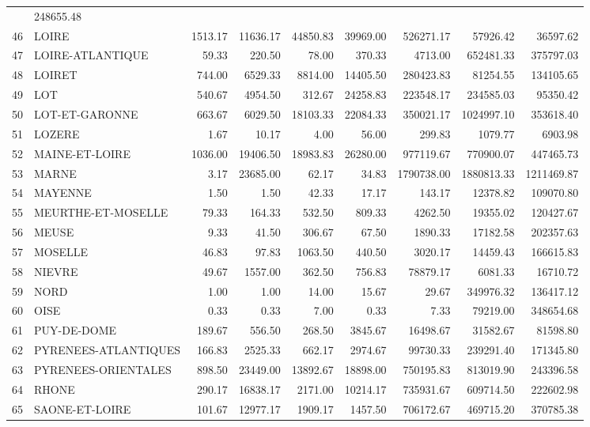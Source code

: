 \documentclass[11pt, a4paper]{article}
\begin{document}
\begin{center}
\begin{table}[ht]
\begin{tabular}{rlrrrrrrr}
& 248655.48 \\ 
  46 & LOIRE & 1513.17 & 11636.17 & 44850.83 & 39969.00 & 526271.17 & 57926.42 & 36597.62 \\ 
  47 & LOIRE-ATLANTIQUE & 59.33 & 220.50 & 78.00 & 370.33 & 4713.00 & 652481.33 & 
375797.03 \\ 
  48 & LOIRET & 744.00 & 6529.33 & 8814.00 & 14405.50 & 280423.83 & 81254.55 & 134105.65 \\ 
  49 & LOT & 540.67 & 4954.50 & 312.67 & 24258.83 & 223548.17 & 234585.03 & 95350.42 \\
  50 & LOT-ET-GARONNE & 663.67 & 6029.50 & 18103.33 & 22084.33 & 350021.17 & 1024997.10 & 353618.40 \\ 
  51 & LOZERE & 1.67 & 10.17 & 4.00 & 56.00 & 299.83 & 1079.77 & 6903.98 \\ 
  52 & MAINE-ET-LOIRE & 1036.00 & 19406.50 & 18983.83 & 26280.00 & 977119.67 & 770900.07 & 447465.73 \\ 
  53 & MARNE & 3.17 & 23685.00 & 62.17 & 34.83 & 1790738.00 & 1880813.33 & 1211469.87 \\
  54 & MAYENNE & 1.50 & 1.50 & 42.33 & 17.17 & 143.17 & 12378.82 & 109070.80 \\ 
  55 & MEURTHE-ET-MOSELLE & 79.33 & 164.33 & 532.50 & 809.33 & 4262.50 & 19355.02 
& 120427.67 \\ 
  56 & MEUSE & 9.33 & 41.50 & 306.67 & 67.50 & 1890.33 & 17182.58 & 202357.63 \\ 
  57 & MOSELLE & 46.83 & 97.83 & 1063.50 & 440.50 & 3020.17 & 14459.43 & 166615.83 \\ 
  58 & NIEVRE & 49.67 & 1557.00 & 362.50 & 756.83 & 78879.17 & 6081.33 & 16710.72 
\\ 
  59 & NORD & 1.00 & 1.00 & 14.00 & 15.67 & 29.67 & 349976.32 & 136417.12 \\ 
  60 & OISE & 0.33 & 0.33 & 7.00 & 0.33 & 7.33 & 79219.00 & 348654.68 \\ 
  61 & PUY-DE-DOME & 189.67 & 556.50 & 268.50 & 3845.67 & 16498.67 & 31582.67 & 81598.80 \\ 
  62 & PYRENEES-ATLANTIQUES & 166.83 & 2525.33 & 662.17 & 2974.67 & 99730.33 & 239291.40 & 171345.80 \\ 
  63 & PYRENEES-ORIENTALES & 898.50 & 23449.00 & 13892.67 & 18898.00 & 750195.83 & 813019.90 & 243396.58 \\ 
  64 & RHONE & 290.17 & 16838.17 & 2171.00 & 10214.17 & 735931.67 & 609714.50 & 222602.98 \\ 
  65 & SAONE-ET-LOIRE & 101.67 & 12977.17 & 1909.17 & 1457.50 & 706172.67 & 469715.20 & 370785.38 \\ 

\end{tabular}
\end{table}
\end{center}
\end{document}
